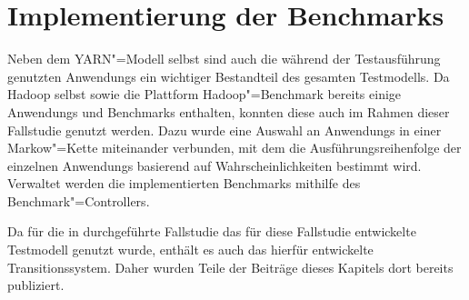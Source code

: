 \chapter{Implementierung der Benchmarks}
\label{ch:benchmarks}

Neben dem \gls{YARN}"=Modell selbst sind auch die während der Testausführung genutzten \glspl{Anwendung} ein wichtiger Bestandteil des gesamten Testmodells.
Da Hadoop selbst sowie die Plattform Hadoop"=Benchmark bereits einige \glspl{Anwendung} und Benchmarks enthalten, konnten diese auch im Rahmen dieser Fallstudie genutzt werden.
Dazu wurde eine Auswahl an \glspl{Anwendung} in einer Markow"=Kette miteinander verbunden, mit dem die Ausführungsreihenfolge der einzelnen \glspl{Anwendung} basierend auf Wahrscheinlichkeiten bestimmt wird.
Verwaltet werden die implementierten Benchmarks mithilfe des Benchmark"=Controllers.

Da für die in \cite{Eberhardinger2018} durchgeführte Fallstudie das für diese Fallstudie entwickelte Testmodell genutzt wurde, enthält es auch das hierfür entwickelte Transitionssystem.
Daher wurden Teile der Beiträge dieses Kapitels dort bereits publiziert.





